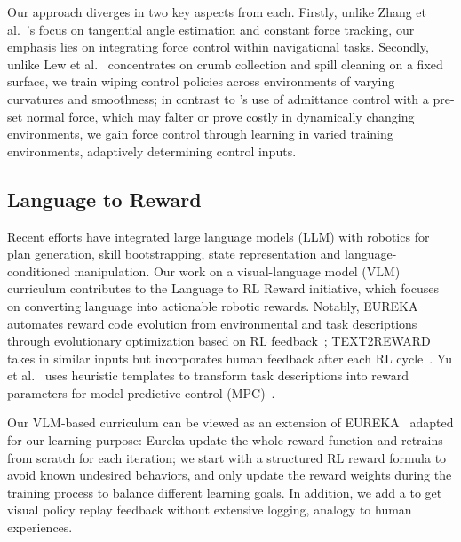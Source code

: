 Our approach diverges in two key aspects from each. Firstly, unlike Zhang et al.~\cite{zhang2020robotic}'s focus on tangential angle estimation and constant force tracking, our emphasis lies on integrating force control within navigational tasks. 
Secondly, unlike Lew et al.~\cite{lew2023robotic} concentrates on crumb collection and spill cleaning on a fixed surface, we train wiping control policies across environments of varying curvatures and smoothness; in contrast to \cite{lew2023robotic}'s use of admittance control with a pre-set normal force, which may falter or prove costly in dynamically changing environments, we gain force control through learning in varied training environments, adaptively determining control inputs.






\subsection{Language to Reward}
Recent efforts have integrated large language models (LLM) with robotics for plan generation, skill bootstrapping, state representation and language-conditioned manipulation. Our work on a visual-language model (VLM) curriculum contributes to the Language to RL Reward initiative, which focuses on converting language into actionable robotic rewards. Notably, EUREKA~\cite{ma2023eureka} automates reward code evolution from environmental and task descriptions through evolutionary optimization based on RL feedback~\cite{ma2023eureka}; TEXT2REWARD~\cite{xie2023text2reward} takes in similar inputs but incorporates human feedback after each RL cycle~\cite{xie2023text2reward}. 
Yu et al.~\cite{yu2023language} uses heuristic templates to transform task descriptions into reward parameters for model predictive control (MPC)~\cite{yu2023language}.

Our VLM-based curriculum can be viewed as an extension of EUREKA~\cite{ma2023eureka} adapted for our learning purpose: Eureka  update the whole reward function and retrains from scratch for each iteration; we start with a structured RL reward formula to avoid known undesired behaviors, and only update the reward weights during the training process to balance different learning goals. In addition, we add a  to get visual policy replay feedback without extensive logging, analogy to human experiences. 







